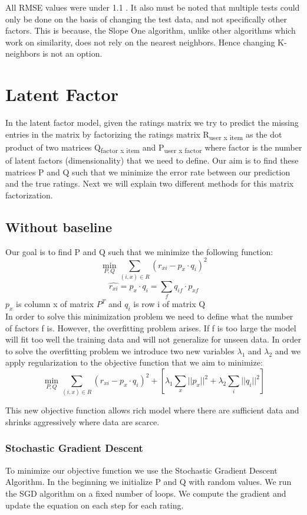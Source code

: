 \documentclass[a4paper]{article}
\begin{document}
All RMSE values were under 1.1 . It also must be noted that multiple tests could only be done on the basis of changing the test data, and not specifically other factors. This is because, the Slope One algorithm, unlike other algorithms which work on similarity, does not rely on the nearest neighbors. Hence changing K-neighbors is not an option. 

\section{Latent Factor}
In the latent factor model, given the ratings matrix we try to predict the missing entries in the matrix by factorizing the ratings matrix R\textsubscript{user x item} as the dot product of two matrices Q\textsubscript{factor x item} and P\textsubscript{user x factor} where factor is the number of latent factors (dimensionality) that we need to define. Our aim is to find these matrices P and Q such that we minimize the error rate between our prediction and the true ratings. Next we will explain two different methods for this matrix factorization.

\subsection{Without baseline}
Our goal is to find P and Q such that we minimize the following function:
$$\min_{P, Q} \sum_{(i, x)\in R}(r_{xi} -p_{x}\cdot q_{i})^2$$
$$\hat{r_{xi}} = p_{x}\cdot q_{i} = \sum_{f} q_{if}\cdot p_{xf} $$
$p_{x}$ is column x of matrix $P^T$ and $q_i$ is row i of matrix Q \\
In order to solve this minimization problem we need to define what the number of factors f is. However, the overfitting problem arises. If f is too large the model will fit too well the training data and will not generalize for unseen data. In order to solve the overfitting problem we introduce two new variables $\lambda_{1}$ and $\lambda_{2}$ and we apply regularization to the objective function that we aim to minimize:
$$\min_{P, Q} \sum_{(i, x)\in R}(r_{xi} -p_{x}\cdot q_{i})^2 + [\lambda_{1}\sum_{x}||p_{x}||^2 + \lambda_{2}\sum_{i}||q_{i}||^2]$$

This new objective function allows rich model where there are sufficient data and shrinks aggressively where data are scarce.

\subsubsection*{Stochastic Gradient Descent}
To minimize our objective function we use the Stochastic Gradient Descent Algorithm. In the beginning we initialize P and Q with random values. We run the SGD algorithm on a fixed number of loops. We compute the gradient and update the equation on each step for each rating. \\
\end{document}
